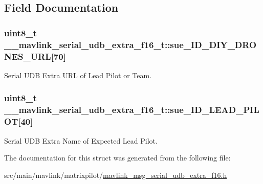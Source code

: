\subsection{Field Documentation}
\hypertarget{struct____mavlink__serial__udb__extra__f16__t_a1cb2ab0062a78bcd24e73da250f9756a}{
\subsubsection[{sue\+\_\+\+I\+D\+\_\+\+D\+I\+Y\+\_\+\+D\+R\+O\+N\+E\+S\+\_\+\+U\+R\+L}]{\setlength{\rightskip}{0pt plus 5cm}uint8\+\_\+t \+\_\+\+\_\+mavlink\+\_\+serial\+\_\+udb\+\_\+extra\+\_\+f16\+\_\+t\+::sue\+\_\+\+I\+D\+\_\+\+D\+I\+Y\+\_\+\+D\+R\+O\+N\+E\+S\+\_\+\+U\+R\+L\mbox{[}70\mbox{]}}}\label{struct____mavlink__serial__udb__extra__f16__t_a1cb2ab0062a78bcd24e73da250f9756a}


Serial U\+D\+B Extra U\+R\+L of Lead Pilot or Team. 

\hypertarget{struct____mavlink__serial__udb__extra__f16__t_a65082cfa195bb99e73f2b62187e6eaad}{
\subsubsection[{sue\+\_\+\+I\+D\+\_\+\+L\+E\+A\+D\+\_\+\+P\+I\+L\+O\+T}]{\setlength{\rightskip}{0pt plus 5cm}uint8\+\_\+t \+\_\+\+\_\+mavlink\+\_\+serial\+\_\+udb\+\_\+extra\+\_\+f16\+\_\+t\+::sue\+\_\+\+I\+D\+\_\+\+L\+E\+A\+D\+\_\+\+P\+I\+L\+O\+T\mbox{[}40\mbox{]}}}\label{struct____mavlink__serial__udb__extra__f16__t_a65082cfa195bb99e73f2b62187e6eaad}


Serial U\+D\+B Extra Name of Expected Lead Pilot. 



The documentation for this struct was generated from the following file\+:\begin{DoxyCompactItemize}
\item 
src/main/mavlink/matrixpilot/\hyperlink{mavlink__msg__serial__udb__extra__f16_8h}{mavlink\+\_\+msg\+\_\+serial\+\_\+udb\+\_\+extra\+\_\+f16.\+h}\end{DoxyCompactItemize}

